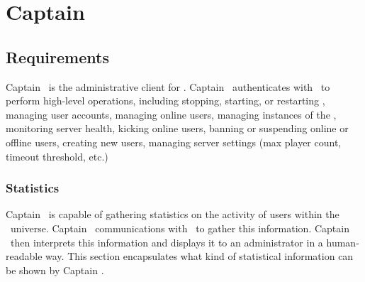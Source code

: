 %

\chapter{Captain \VTank}
\label{captainvtank}

\section{Requirements}

Captain \VTank\ is the administrative client for \VTank. Captain \VTank\ authenticates with \MainServer\ to perform high-level operations, including stopping, starting, or restarting \MainServer, managing user accounts, managing online users, managing instances of the \GameServer, monitoring server health, kicking online users, banning or suspending online or offline users, creating new users, managing server settings (max player count, timeout threshold, etc.)

\subsection{Statistics}

Captain \VTank\ is capable of gathering statistics on the activity of users within the \VTank\ universe. Captain \VTank\ communications with \MainServer\ to gather this information. Captain \VTank\ then interprets this information and displays it to an administrator in a human-readable way. This section encapsulates what kind of statistical information can be shown by Captain \VTank.

